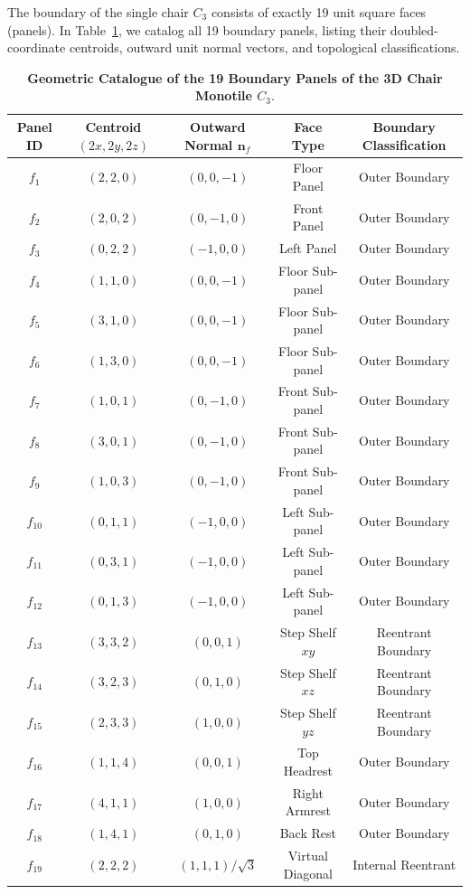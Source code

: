\documentclass[11pt,a4paper]{article}
\theoremstyle{definition}
\begin{document}
The boundary of the single chair $C_3$ consists of exactly 19 unit square faces (panels). In Table~\ref{tab:c3_panels}, we catalog all 19 boundary panels, listing their doubled-coordinate centroids, outward unit normal vectors, and topological classifications.

\begin{table}[h!]
\centering
\small
\caption{\textbf{Geometric Catalogue of the 19 Boundary Panels of the 3D Chair Monotile $C_3$}.}
\label{tab:c3_panels}
\begin{tabular}{ccccc}
\toprule
\textbf{Panel ID} & \textbf{Centroid $(2x, 2y, 2z)$} & \textbf{Outward Normal $\mathbf{n}_f$} & \textbf{Face Type} & \textbf{Boundary Classification} \\
\midrule
$f_1$ & $(2, 2, 0)$ & $(0, 0, -1)$ & Floor Panel & Outer Boundary \\
$f_2$ & $(2, 0, 2)$ & $(0, -1, 0)$ & Front Panel & Outer Boundary \\
$f_3$ & $(0, 2, 2)$ & $(-1, 0, 0)$ & Left Panel & Outer Boundary \\
$f_4$ & $(1, 1, 0)$ & $(0, 0, -1)$ & Floor Sub-panel & Outer Boundary \\
$f_5$ & $(3, 1, 0)$ & $(0, 0, -1)$ & Floor Sub-panel & Outer Boundary \\
$f_6$ & $(1, 3, 0)$ & $(0, 0, -1)$ & Floor Sub-panel & Outer Boundary \\
$f_7$ & $(1, 0, 1)$ & $(0, -1, 0)$ & Front Sub-panel & Outer Boundary \\
$f_8$ & $(3, 0, 1)$ & $(0, -1, 0)$ & Front Sub-panel & Outer Boundary \\
$f_9$ & $(1, 0, 3)$ & $(0, -1, 0)$ & Front Sub-panel & Outer Boundary \\
$f_{10}$ & $(0, 1, 1)$ & $(-1, 0, 0)$ & Left Sub-panel & Outer Boundary \\
$f_{11}$ & $(0, 3, 1)$ & $(-1, 0, 0)$ & Left Sub-panel & Outer Boundary \\
$f_{12}$ & $(0, 1, 3)$ & $(-1, 0, 0)$ & Left Sub-panel & Outer Boundary \\
$f_{13}$ & $(3, 3, 2)$ & $(0, 0, 1)$ & Step Shelf $xy$ & Reentrant Boundary \\
$f_{14}$ & $(3, 2, 3)$ & $(0, 1, 0)$ & Step Shelf $xz$ & Reentrant Boundary \\
$f_{15}$ & $(2, 3, 3)$ & $(1, 0, 0)$ & Step Shelf $yz$ & Reentrant Boundary \\
$f_{16}$ & $(1, 1, 4)$ & $(0, 0, 1)$ & Top Headrest & Outer Boundary \\
$f_{17}$ & $(4, 1, 1)$ & $(1, 0, 0)$ & Right Armrest & Outer Boundary \\
$f_{18}$ & $(1, 4, 1)$ & $(0, 1, 0)$ & Back Rest & Outer Boundary \\
$f_{19}$ & $(2, 2, 2)$ & $(1, 1, 1)/\sqrt{3}$ & Virtual Diagonal & Internal Reentrant \\
\bottomrule
\end{tabular}
\end{table}
\end{document}
